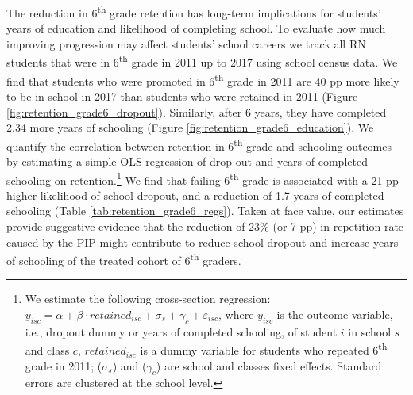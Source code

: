 \documentclass[11pt,a4paper]{article}
\begin{document}
	\clearpage
	
	The reduction in 6\textsuperscript{th} grade retention has long-term implications for students’ years of education and likelihood of completing school. To evaluate how much improving progression may affect students' school careers we track all RN students that were in 6\textsuperscript{th} grade in 2011 up to 2017 using school census data. We find that students who were promoted in 6\textsuperscript{th} grade in 2011 are 40 pp more likely to be in school in 2017 than students who were retained in 2011 (Figure \ref{fig:retention_grade6_dropout}). Similarly, after 6 years, they have completed 2.34 more years of schooling (Figure \ref{fig:retention_grade6_education}). We quantify the correlation between retention in 6\textsuperscript{th} grade and schooling outcomes by estimating a simple OLS regression of drop-out and years of completed schooling on retention.\footnote{We estimate the following cross-section regression: $y_{isc} = \alpha + \beta \cdot retained_{isc} + \sigma_{s} + \gamma_{c} + \varepsilon_{isc}$, where $y_{isc}$ is the outcome variable, i.e., dropout dummy or years of completed schooling, of student $i$ in school $s$ and class $c$, $retained_{isc}$ is a dummy variable for students who repeated 6\textsuperscript{th} grade in 2011; ($\sigma_{s}$) and ($\gamma_{c}$) are school and classes fixed effects. Standard errors are clustered at the school level.} We find that failing 6\textsuperscript{th} grade is associated with a 21 pp higher likelihood of school dropout, and a reduction of 1.7 years of completed schooling (Table \ref{tab:retention_grade6_regs}). Taken at face value, our estimates provide suggestive evidence that the reduction of 23\% (or 7 pp) in repetition rate caused by the PIP might contribute to reduce school dropout and increase years of schooling of the treated cohort of 6\textsuperscript{th} graders.
	
\end{document}
